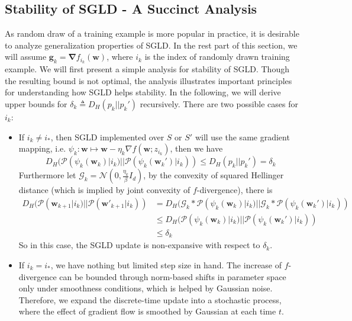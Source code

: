 \documentclass[final,12pt]{colt2018} %
\begin{document}
\subsection{Stability of SGLD - A Succinct Analysis}\label{section-succinct}
As random draw of a training example is more popular in practice, it is desirable to analyze generalization properties of SGLD. In the rest part of this section, we will assume $\bm{g}_k=\bm{\nabla} f_{i_k}(\bm{w})$, where $i_k$ is the index of randomly drawn training example. We will first present a simple analysis for stability of SGLD. Though the resulting bound is not optimal, the analysis illustrates important principles for understanding how SGLD helps stability. In the following, we will derive upper bounds for $\delta_k\triangleq D_H(p_k||p_k')$ recursively. There are two possible cases for $i_k$:
\begin{itemize}
  \item If $i_k\neq i_*$, then SGLD implemented over $S$ or $S'$ will use the same gradient mapping, i.e. $\psi_k: \bm{w}\mapsto \bm{w}-\eta_k\nabla f(\bm{w};z_{i_k})$, then we have 
  \begin{equation}
  D_{H}(\mathcal{P}(\psi_k (\bm{w}_k)|i_k)||\mathcal{P}(\psi_k (\bm{w}_k')|i_k))\leq D_{H}(p_k||p_k')=\delta_k
  \end{equation}
  Furthermore let $\mathcal{G}_k=\mathcal{N}(0,\frac{\eta_k}{\beta}I_d)$, by the convexity of squared Hellinger distance (which is implied by joint convexity of $f$-divergence), there is 
  \begin{align*}
  D_H(\mathcal{P}(\bm{w}_{k+1}|i_k)||\mathcal{P}(\bm{w}'_{k+1}|i_k))&=D_H(\mathcal{G}_k*\mathcal{P}(\psi_k (\bm{w}_k)|i_k)||\mathcal{G}_k*\mathcal{P}(\psi_k (\bm{w}_k')|i_k))\\
  &\le D_{H}(\mathcal{P}(\psi_k (\bm{w}_k)|i_k)||\mathcal{P}(\psi_k (\bm{w}_k')|i_k))\\
  &\le \delta_k
  \end{align*}
  So in this case, the SGLD update is non-expansive with respect to $\delta_k$.

  \item If $i_k=i_*$, we have nothing but limited step size in hand. The increase of $f$-divergence can be bounded through norm-based shifts in parameter space only under smoothness conditions, which is helped by Gaussian noise. Therefore, we expand the discrete-time update into a stochastic process, where the effect of gradient flow is smoothed by Gaussian at each time $t$.
\end{itemize}
\end{document}
